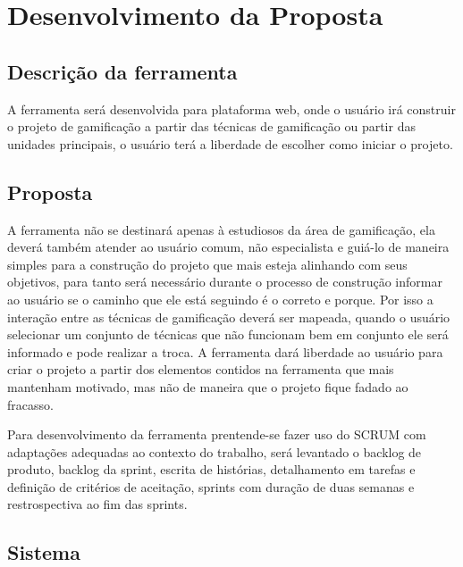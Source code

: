 
\chapter[Desenvolvimento da Proposta]{Desenvolvimento da Proposta}

\section{Descrição da ferramenta}

	A ferramenta será desenvolvida para plataforma web, onde o usuário irá construir o projeto de gamificação a partir das técnicas de gamificação ou partir das unidades principais, o usuário terá a liberdade de escolher como iniciar o projeto. 

\section{Proposta}

A ferramenta não se destinará apenas à estudiosos da área de gamificação, ela deverá também atender ao usuário comum, não especialista e guiá-lo de maneira simples para a construção do projeto que mais esteja alinhando com seus objetivos, para tanto será necessário durante o processo de construção informar ao usuário se o caminho que ele está seguindo é o correto e porque. Por isso a interação entre as técnicas de gamificação deverá ser mapeada, quando o usuário selecionar um conjunto de técnicas que não funcionam bem em conjunto ele será informado e pode realizar a troca. A ferramenta dará  liberdade ao usuário para criar o projeto a partir dos elementos contidos na ferramenta que mais mantenham motivado, mas não de maneira que o projeto fique fadado ao fracasso.

Para desenvolvimento da ferramenta prentende-se fazer uso do SCRUM com adaptações adequadas ao contexto do trabalho, será levantado o backlog de produto, backlog da sprint, escrita de histórias, detalhamento em tarefas e definição de critérios de aceitação, sprints com duração de duas semanas e restrospectiva ao fim das sprints.

\section{Sistema}

